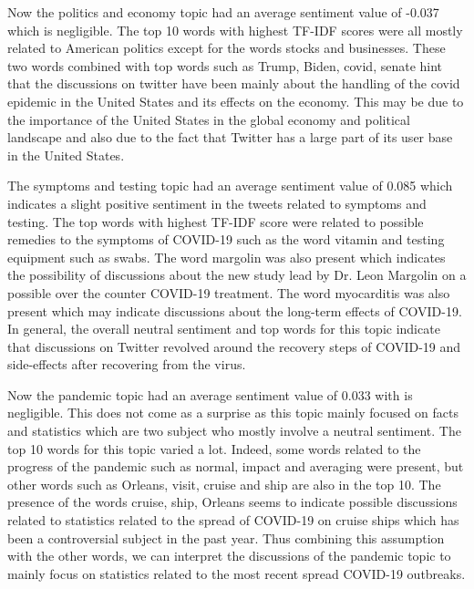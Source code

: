 \documentclass[letterpaper]{article} %
\begin{document}
Now the politics and economy topic had an average sentiment value of -0.037 which is negligible. The top 10 words with highest TF-IDF scores were all mostly related to American politics except for the words stocks and businesses. These two words combined with top words such as Trump, Biden, covid, senate hint that the discussions on twitter have been mainly about the handling of the covid epidemic in the United States and its effects on the economy. This may be due to the importance of the United States in the global economy and political landscape and also due to the fact that Twitter has a large part of its user base in the United States. 

The symptoms and testing topic had an average sentiment value of 0.085 which indicates a slight positive sentiment in the tweets related to symptoms and testing. The top words with highest TF-IDF score were related to possible remedies to the symptoms of COVID-19 such as the word vitamin and testing equipment such as swabs. The word margolin was also present which indicates the possibility of discussions about the new study lead by Dr. Leon Margolin on a possible over the counter COVID-19 treatment. The word myocarditis was also present which may indicate discussions about the long-term effects of COVID-19. In general, the overall neutral sentiment and top words for this topic indicate that discussions on Twitter revolved around the recovery steps of COVID-19 and side-effects after recovering from the virus.

Now the pandemic topic had an average sentiment value of 0.033 with is negligible. This does not come as a surprise as this topic mainly focused on facts and statistics which are two subject who mostly involve a neutral sentiment. The top 10 words for this topic varied a lot. Indeed, some words related to the progress of the pandemic such as normal, impact and averaging were present, but other words such as Orleans, visit, cruise and ship are also in the top 10. The presence of the words cruise, ship, Orleans seems to indicate possible discussions related to statistics related to the spread of COVID-19 on cruise ships which has been a controversial subject in the past year. Thus combining this assumption with the other words, we can interpret the discussions of the pandemic topic to mainly focus on statistics related to the most recent spread COVID-19 outbreaks.
\end{document}
